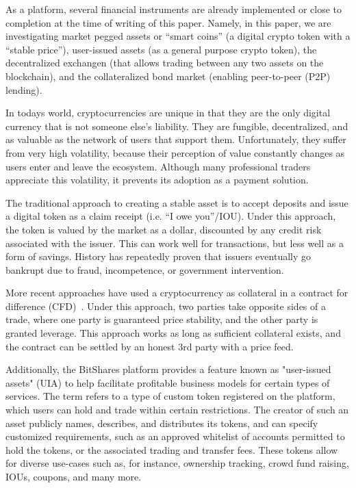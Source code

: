 As a platform, several financial instruments are already implemented or close
to completion at the time of writing of this paper. Namely, in this paper, we
are investigating market pegged assets or ``smart coins'' (a digital crypto
token with a ``stable price''), user-issued assets (as a general purpose crypto
token), the decentralized exchangen (that allows trading between any two assets
on the blockchain), and the collateralized bond market (enabling peer-to-peer
(P2P) lending).

In todays world, cryptocurrencies are unique in that they are the only digital
currency that is not someone else's liability. They are fungible,
decentralized, and as valuable as the network of users that support them.
Unfortunately, they suffer from very high volatility, because their perception
of value constantly changes as users enter and leave the ecosystem. Although
many professional traders appreciate this volatility, it prevents its adoption
as a payment solution.

The traditional approach to creating a stable asset is to accept deposits and
issue a digital token as a claim receipt (i.e. ``I owe you''/IOU). Under this
approach, the token is valued by the market as a dollar, discounted by any
credit risk associated with the issuer. This can work well for transactions,
but less well as a form of savings. History has repeatedly proven that issuers
eventually go bankrupt due to fraud, incompetence, or government intervention.

More recent approaches have used a cryptocurrency as collateral in a contract
for difference (CFD)~\cite{def:cfd}. Under this approach, two parties take
opposite sides of a trade, where one party is guaranteed price stability, and
the other party is granted leverage. This approach works as long as sufficient
collateral exists, and the contract can be settled by an honest 3rd party with
a price feed.

Additionally, the BitShares platform provides a feature known as "user-issued
assets" (UIA) to help facilitate profitable business models for certain types
of services.  The term refers to a type of custom token registered on the
platform, which users can hold and trade within certain restrictions. The
creator of such an asset publicly names, describes, and distributes its
tokens, and can specify customized requirements, such as an approved whitelist
of accounts permitted to hold the tokens, or the associated trading and
transfer fees. These tokens allow for diverse use-cases such as, for instance,
ownership tracking, crowd fund raising, IOUs, coupons, and many more.

